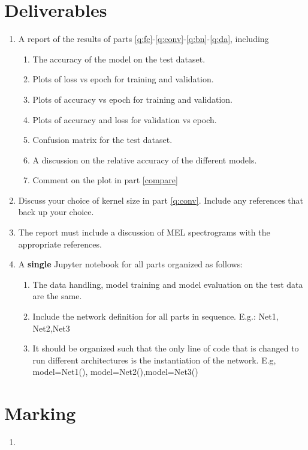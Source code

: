 \documentclass{article}
\begin{document}
\section{Deliverables}
\begin{enumerate}
    \item A report of the results of parts \ref{q:fc}-\ref{q:conv}-\ref{q:bn}-\ref{q:da}, including 
    \begin{enumerate}
        \item The accuracy of the model on the test dataset.
        \item Plots of loss vs epoch for training and validation.
        \item Plots of accuracy vs epoch for training and validation.
        \item Plots of accuracy and loss for validation vs epoch.\label{compare}
        \item Confusion matrix for the test dataset.
        \item A discussion on the relative accuracy of the different models.
        \item Comment on the plot in part \ref{compare} 
    \end{enumerate}
    \item Discuss your choice of kernel size in part \ref{q:conv}. Include any references that back up your choice.
    \item The report must include a discussion of MEL spectrograms with the appropriate references.
    \item A \textbf{single} Jupyter notebook for all parts organized as follows:
    \begin{enumerate}
        \item The data handling, model training and model evaluation on the test data are the same.
        \item Include the network definition for all parts in sequence. E.g.: Net1, Net2,Net3
        \item It should be organized such that the only line of code that is changed to run different architectures is the instantiation of the network. E.g, model=Net1(), model=Net2(),model=Net3()
      
    \end{enumerate}
\end{enumerate}
\section{Marking}
\begin{enumerate}
    \item 
\end{enumerate}
\end{document}

